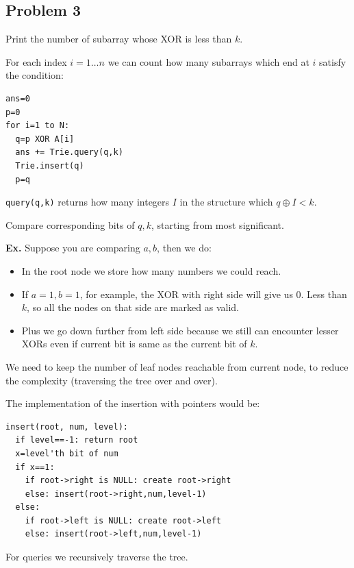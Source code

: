 \documentclass{IEEEtran}
\begin{document}
    \subsection{Problem 3}
      Print the number of subarray whose XOR is less than $k$. \par 
      For each index $i=1\ldots n$ we can count how many subarrays which end at $i$ satisfy the condition:
      \begin{lstlisting}
ans=0
p=0
for i=1 to N:
  q=p XOR A[i]
  ans += Trie.query(q,k)
  Trie.insert(q)
  p=q
      \end{lstlisting}
      \par \texttt{query(q,k)} returns how many integers $I$ in the structure which $q \oplus I <k$. \par
      Compare corresponding bits of $q, k$, starting from most significant. \par 
      \textbf{Ex.} Suppose you are comparing $a, b$, then we do:
      \begin{itemize}
        \item In the root node we store how many numbers we could reach.
        \item If $a=1,b=1$, for example, the XOR with right side will give us 0. Less than $k$, so all the nodes on that side are marked as valid.
        \item Plus we go down further from left side because we still can encounter lesser XORs even if current bit is same as the current bit of $k$. 
      \end{itemize}
      \par We need to keep the number of leaf nodes reachable from current node, to reduce the complexity (traversing the tree over and over).\par 
      The implementation of the insertion with pointers would be:
      \begin{lstlisting}
insert(root, num, level):
  if level==-1: return root
  x=level'th bit of num
  if x==1:
    if root->right is NULL: create root->right
    else: insert(root->right,num,level-1)
  else:
    if root->left is NULL: create root->left
    else: insert(root->left,num,level-1)
      \end{lstlisting}
      \par For queries we recursively traverse the tree. 
\end{document}
